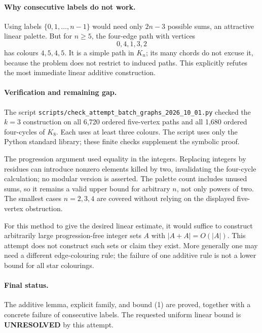 \documentclass[11pt,a4paper]{article}
\begin{document}
\paragraph{Why consecutive labels do not work.}
Using labels $\{0,1,\ldots,n-1\}$ would need only $2n-3$ possible sums, an attractive linear palette. But for $n\ge5$, the four-edge path with vertices
\[
 0,4,1,3,2
\]
has colours $4,5,4,5$. It is a simple path in $K_n$; its many chords do not excuse it, because the problem does not restrict to induced paths. This explicitly refutes the most immediate linear additive construction.

\paragraph{Verification and remaining gap.}
The script \texttt{scripts/check\_attempt\_batch\_graphs\_2026\_10\_01.py} checked the $k=3$ construction on all 6,720 ordered five-vertex paths and all 1,680 ordered four-cycles of $K_8$. Each uses at least three colours. The script uses only the Python standard library; these finite checks supplement the symbolic proof.

The progression argument used equality in the integers. Replacing integers by residues can introduce nonzero elements killed by two, invalidating the four-cycle calculation; no modular version is asserted. The palette count includes unused sums, so it remains a valid upper bound for arbitrary $n$, not only powers of two. The smallest cases $n=2,3,4$ are covered without relying on the displayed five-vertex obstruction.

For this method to give the desired linear estimate, it would suffice to construct arbitrarily large progression-free integer sets $A$ with $|A+A|=O(|A|)$. This attempt does not construct such sets or claim they exist. More generally one may need a different edge-colouring rule; the failure of one additive rule is not a lower bound for all star colourings.

\paragraph{Final status.}
The additive lemma, explicit family, and bound (1) are proved, together with a concrete failure of consecutive labels. The requested uniform linear bound is \textbf{UNRESOLVED} by this attempt.
\end{document}
